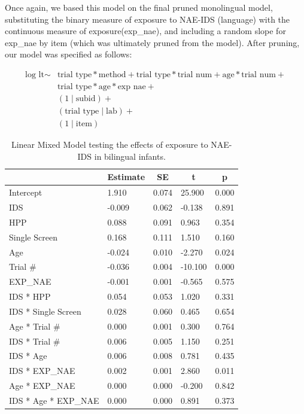 \documentclass[,man,floatsintext]{apa6}
\begin{document}
Once again, we based this model on the final pruned monolingual model, substituting the binary measure of exposure to NAE-IDS (language) with the continuous measure of exposure(exp\_nae), and including a random slope for exp\_nae by item (which was ultimately pruned from the model). After pruning, our model was specified as follows:

\begin{equation}
\begin{split}
\text{log lt} \sim & \text{trial type} * \text{method} + \text{trial type} * \text{trial num} + \text{age} * \text{trial num} + \\
& \text{trial type} * \text{age} * \text{exp nae} + \\
& (1\mid \text{subid}) + \\
& (\text{trial type} \mid \text{lab}) + \\
& (1 \mid \text{item})
\end{split}
\end{equation}

\begin{table}[tbp]

\begin{center}
\begin{threeparttable}

\caption{\label{tab:unnamed-chunk-9}Linear Mixed Model testing the effects of exposure to NAE-IDS in bilingual infants.}

\begin{tabular}{lllll}
\toprule
 & \multicolumn{1}{c}{Estimate} & \multicolumn{1}{c}{SE} & \multicolumn{1}{c}{t} & \multicolumn{1}{c}{p}\\
\midrule
Intercept & 1.910 & 0.074 & 25.900 & 0.000\\
IDS & -0.009 & 0.062 & -0.138 & 0.891\\
HPP & 0.088 & 0.091 & 0.963 & 0.354\\
Single Screen & 0.168 & 0.111 & 1.510 & 0.160\\
Age & -0.024 & 0.010 & -2.270 & 0.024\\
Trial \# & -0.036 & 0.004 & -10.100 & 0.000\\
EXP\_NAE & -0.001 & 0.001 & -0.565 & 0.575\\
IDS * HPP & 0.054 & 0.053 & 1.020 & 0.331\\
IDS * Single Screen & 0.028 & 0.060 & 0.465 & 0.654\\
Age * Trial \# & 0.000 & 0.001 & 0.300 & 0.764\\
IDS * Trial \# & 0.006 & 0.005 & 1.150 & 0.251\\
IDS * Age & 0.006 & 0.008 & 0.781 & 0.435\\
IDS * EXP\_NAE & 0.002 & 0.001 & 2.860 & 0.011\\
Age * EXP\_NAE & 0.000 & 0.000 & -0.200 & 0.842\\
IDS * Age * EXP\_NAE & 0.000 & 0.000 & 0.891 & 0.373\\
\bottomrule
\end{tabular}

\end{threeparttable}
\end{center}

\end{table}
\end{document}
